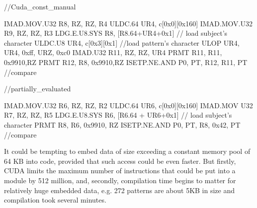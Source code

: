\begin{listing}
    \begin{pyglist}[language=C,caption=Cuda\_const\_manual vs partially\_evaluated,label=code:vs]
        //Cuda_const_manual

IMAD.MOV.U32 R8, RZ, RZ, R4
ULDC.64 UR4, c[0x0][0x160]
IMAD.MOV.U32 R9, RZ, RZ, R3
LDG.E.U8.SYS R8, [R8.64+UR4+0x1] // load subject's character
ULDC.U8 UR4, c[0x3][0x1] //load pattern's character
ULOP UR4, UR4, 0xff, URZ, 0xc0
IMAD.U32 R11, RZ, RZ, UR4
PRMT R11, R11, 0x9910,RZ
PRMT R12, R8, 0x9910,RZ
ISETP.NE.AND P0, PT, R12, R11, PT //compare

    //partially_evaluated

IMAD.MOV.U32 R6, RZ, RZ, R2
ULDC.64 UR6, c[0x0][0x160]
IMAD.MOV U32 R7, RZ, RZ, R5
LDG.E.U8.SYS R6, [R6.64 + UR6+0x1] // load subject's character
PRMT R8, R6, 0x9910, RZ
ISETP.NE.AND P0, PT, R8, 0x42, PT //compare

    \end{pyglist}
    \end{listing}

It could be tempting to embed data of size exceeding a constant memory pool
of 64 KB into code, provided that such access could be even faster. But
firstly, CUDA limits the maximum number of instructions that could be put into a module by 512 million, and, secondly,
compilation time begins to matter for relatively huge embedded data,
e.g. 272 patterns are about 5KB in size and compilation took several minutes.


